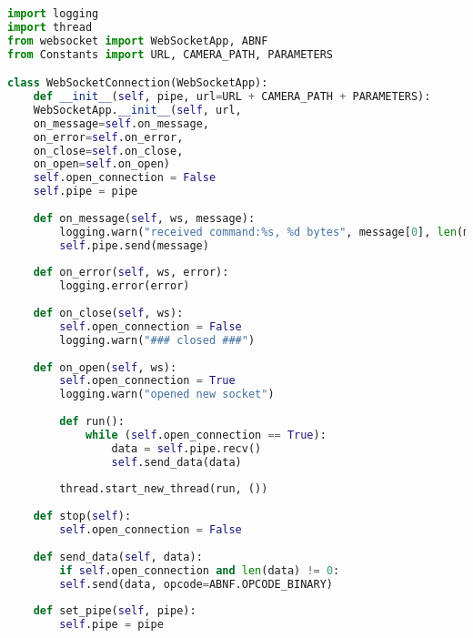 \documentclass[hidelinks,11pt,a4paper,oneside,article]{memoir}
\begin{document}
\begin{lstlisting}[label={listing:rpi-ws},caption={Websocket Class},language=Python, style=styleprogrammingappendix]
import logging
import thread
from websocket import WebSocketApp, ABNF
from Constants import URL, CAMERA_PATH, PARAMETERS

class WebSocketConnection(WebSocketApp):
    def __init__(self, pipe, url=URL + CAMERA_PATH + PARAMETERS):
    WebSocketApp.__init__(self, url,
    on_message=self.on_message,
    on_error=self.on_error,
    on_close=self.on_close,
    on_open=self.on_open)
    self.open_connection = False
    self.pipe = pipe
    
    def on_message(self, ws, message):
        logging.warn("received command:%s, %d bytes", message[0], len(message))
        self.pipe.send(message)
    
    def on_error(self, ws, error):
        logging.error(error)
    
    def on_close(self, ws):
        self.open_connection = False
        logging.warn("### closed ###")
    
    def on_open(self, ws):
        self.open_connection = True
        logging.warn("opened new socket")
    
        def run():
            while (self.open_connection == True):
                data = self.pipe.recv()
                self.send_data(data)
        
        thread.start_new_thread(run, ())
    
    def stop(self):
        self.open_connection = False
    
    def send_data(self, data):
        if self.open_connection and len(data) != 0:
        self.send(data, opcode=ABNF.OPCODE_BINARY)
        
    def set_pipe(self, pipe):
        self.pipe = pipe
\end{lstlisting}\vspace{14pt}
\end{document}
